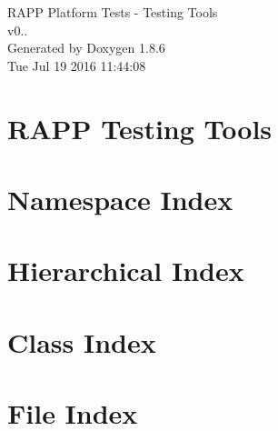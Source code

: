 \documentclass[twoside]{book}
\newcommand{\clearemptydoublepage}{%
  \newpage{\pagestyle{empty}\cleardoublepage}%
}
\begin{document}
\hypersetup{pageanchor=false}
\begin{titlepage}
\vspace*{7cm}
\begin{center}%
{\Large R\-A\-P\-P Platform Tests -\/ Testing Tools \\[1ex]\large v0.. }\\
\vspace*{1cm}
{\large Generated by Doxygen 1.8.6}\\
\vspace*{0.5cm}
{\small Tue Jul 19 2016 11:44:08}\\
\end{center}
\end{titlepage}
\clearemptydoublepage
\tableofcontents
\clearemptydoublepage
{}
\hypersetup{pageanchor=true}

\chapter{R\-A\-P\-P Testing Tools}
\label{md__home_travis_rapp_temp_rapp-platform_rapp_testing_tools_README}
\hypertarget{md__home_travis_rapp_temp_rapp-platform_rapp_testing_tools_README}{}

\chapter{Namespace Index}

\chapter{Hierarchical Index}

\chapter{Class Index}

\chapter{File Index}

\end{document}
